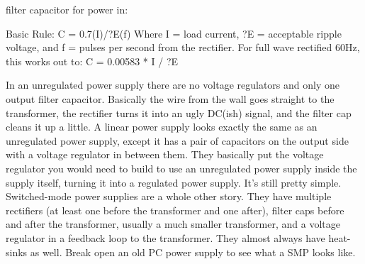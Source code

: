 filter capacitor for power in:

Basic Rule:
C = 0.7(I)/?E(f)
Where I = load current, ?E = acceptable ripple voltage, and f = pulses per second from the rectifier.
For full wave rectified 60Hz, this works out to:
C = 0.00583 * I / ?E






In an unregulated power supply there are no voltage regulators and only one output filter capacitor. Basically the wire from the wall goes straight to the transformer, the rectifier turns it into an ugly DC(ish) signal, and the filter cap cleans it up a little.
A linear power supply looks exactly the same as an unregulated power supply, except it has a pair of capacitors on the output side with a voltage regulator in between them. They basically put the voltage regulator you would need to build to use an unregulated power supply inside the supply itself, turning it into a regulated power supply. It’s still pretty simple.
Switched-mode power supplies are a whole other story. They have multiple rectifiers (at least one before the transformer and one after), filter caps before and after the transformer, usually a much smaller transformer, and a voltage regulator in a feedback loop to the transformer. They almost always have heat-sinks as well.
Break open an old PC power supply to see what a SMP looks like.